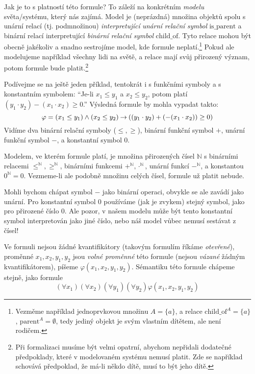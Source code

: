 Jak je to s platností této formule? To záleží na konkrétním \emph{modelu} světa/systému, který nás zajímá. Model je (neprázdná) množina objektů spolu s unární relací (tj. podmnožinou) \emph{interpretující} \emph{unární relační symbol} $\mathrm{is\_parent}$ a binární relací interpretující \emph{binární relační symbol} $\mathrm{child\_of}$. Tyto relace mohou být obecně jakékoliv a snadno sestrojíme model, kde formule neplatí.\footnote{Vezměme například jednoprvkovou množinu $A=\{a\}$, a relace $\mathrm{child\_of}^A=\{a\}$, $\mathrm{parent}^A=\emptyset$, tedy jediný objekt je svým vlastním dítětem, ale není rodičem.} Pokud ale modelujeme například všechny lidi na světě, a relace mají svůj přirozený význam, potom formule bude platit.\footnote{Při formalizaci musíme být velmi opatrní, abychom nepřidali dodatečné předpoklady, které v modelovaném systému nemusí platit. Zde se například schovává předpoklad, že má-li někdo dítě, musí to být jeho dítě.}

Podívejme se na ještě jeden příklad, tentokrát i s funkčními symboly a s konstantním symbolem: ``Je-li $x_1\leq y_1$ a $x_2\leq y_2$, potom platí $(y_1 \cdot y_2)-(x_1\cdot x_2)\geq 0$.'' Výsledná formule by mohla vypadat takto:
$$
\varphi=(x_1\leq y_1)\land (x_2\leq y_2)\mathbin{\rightarrow} ((y_1 \cdot y_2)+(-(x_1\cdot x_2))\geq 0)
$$
Vidíme dva binární relační symboly ($\leq,\geq$), binární funkční symbol $+$, unární funkční symbol $-$, a konstantní symbol $0$. 

Modelem, ve kterém formule platí, je množina přirozených čísel $\mathbb N$ s binárními relacemi $\leq^\mathbb N,\geq^\mathbb N$, binárními funkcemi $+^\mathbb N,\cdot^\mathbb N$, unární funkcí $-^\mathbb N$, a konstantou $0^\mathbb N=0$. Vezmeme-li ale podobně množinu celých čísel, formule už platit nebude.

\begin{remark}
Mohli bychom chápat symbol $-$ jako binární operaci, obvykle se ale zavádí jako unární. Pro konstantní symbol $0$ používáme (jak je zvykem) stejný symbol, jako pro přirozené číslo 0. Ale pozor, v našem modelu může být tento konstantní symbol interpretován jako jiné číslo, nebo náš model vůbec nemusí sestávat z čísel!
\end{remark}

Ve formuli nejsou žádné kvantifikátory (takovým formulím říkáme \emph{otevřené}), proměnné $x_1,x_2,y_1,y_2$ jsou \emph{volné proměnné} této formule (nejsou \emph{vázané} žádným kvantifikátorem), píšeme $\varphi(x_1,x_2,y_1,y_2)$. Sémantiku této formule chápeme stejně, jako formule
$$
(\forall x_1)(\forall x_2)(\forall y_1)(\forall y_2)\varphi(x_1,x_2,y_1,y_2)
$$

